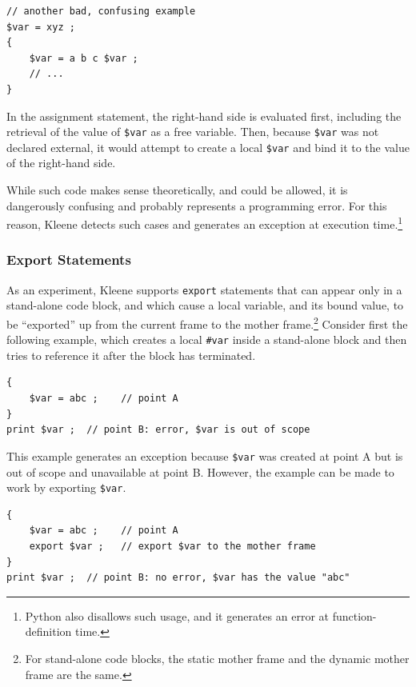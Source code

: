 \documentclass[letterpaper,12pt]{article}
\begin{document}
\begin{samepage}
\begin{Verbatim}[fontsize=\small]
// another bad, confusing example
$var = xyz ;
{
    $var = a b c $var ;  
    // ...
}
\end{Verbatim}
\end{samepage}

\noindent
In the assignment statement, the right-hand side is evaluated first, including the
retrieval of the value of \verb!$var! as a free variable.  Then, because \verb!$var! was
not declared external, it would attempt to create a local \verb!$var! and bind it to the
value of the right-hand side.


While such code makes sense theoretically, and could be allowed,
it is dangerously confusing and probably represents a programming error.  For this
reason, Kleene detects such cases and generates an exception at execution
time.\footnote{Python also disallows such usage, and it generates an error at
function-definition time.}


\subsubsection{Export Statements}

As an experiment, Kleene supports \texttt{export} statements that can
appear only in a stand-alone code block, and which cause a local
variable, and its bound value, to be ``exported'' up from the current
frame to the mother frame.\footnote{For stand-alone code blocks, the
static mother frame and the dynamic mother frame are the same.} Consider
first the following example, which creates a local \verb!#var! inside a
stand-alone block and then tries to reference it after the block has
terminated.

\begin{samepage}
\begin{Verbatim}[fontsize=\small]
{
    $var = abc ;	// point A
}
print $var ;  // point B: error, $var is out of scope
\end{Verbatim}
\end{samepage}

\noindent
This example generates an exception because \verb!$var! was created at point
A but is out of scope and unavailable at point B.  However, the example can be made to work by exporting \verb!$var!.

\begin{samepage}
\begin{Verbatim}[fontsize=\small]
{
    $var = abc ;	// point A
    export $var ;	// export $var to the mother frame
}
print $var ;  // point B: no error, $var has the value "abc"
\end{Verbatim}
\end{samepage}
\end{document}

